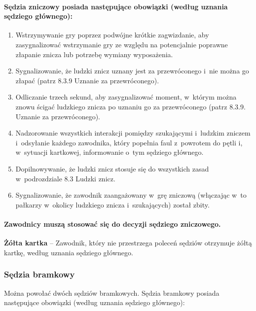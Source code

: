 \documentclass[12pt,a4paper]{article}
\newcommand\yellowcard[1]{\bgroup\textcolor{darkyellow}{\textbf{#1}}}
\begin{document}
\paragraph{Sędzia zniczowy posiada następujące obowiązki (według
	uznania sędziego głównego):}

\begin{enumerate}
	\item Wstrzymywanie gry poprzez podwójne krótkie zagwizdanie, aby
	      zasygnalizować wstrzymanie gry ze względu na potencjalnie poprawne
	      złapanie znicza lub potrzebę wymiany wyposażenia.

	\item Sygnalizowanie, że ludzki znicz uznany jest za przewróconego i~nie
	      można go złapać (patrz 8.3.9 Uznanie za przewróconego).

	\item Odliczanie trzech sekund, aby zasygnalizować moment, w~którym można
	      znowu ścigać ludzkiego znicza po uznaniu go za przewróconego (patrz
	      8.3.9. Uznanie za przewróconego).

	\item Nadzorowanie wszystkich interakcji pomiędzy szukającymi i~ludzkim
	      zniczem i~odsyłanie każdego zawodnika, który popełnia faul z~powrotem do
	      pętli i, w~sytuacji kartkowej, informowanie o~tym sędziego głównego.

	\item Dopilnowywanie, że ludzki znicz stosuje się do wszystkich zasad w~podrozdziale 8.3 Ludzki znicz.

	\item Sygnalizowanie, że zawodnik zaangażowany w~grę zniczową (włączając w~to pałkarzy w~okolicy ludzkiego znicza i~szukających) został zbity.
\end{enumerate}

\paragraph{Zawodnicy muszą stosować się do decyzji sędziego
	zniczowego.}

\yellowcard{Żółta kartka} -- Zawodnik, który nie przestrzega poleceń sędziów
otrzymuje żółtą kartkę, według uznania sędziego głównego.

\subsubsection{Sędzia bramkowy}

Można powołać dwóch sędziów bramkowych. Sędzia bramkowy posiada
następujące obowiązki (według uznania sędziego głównego):
\end{document}
